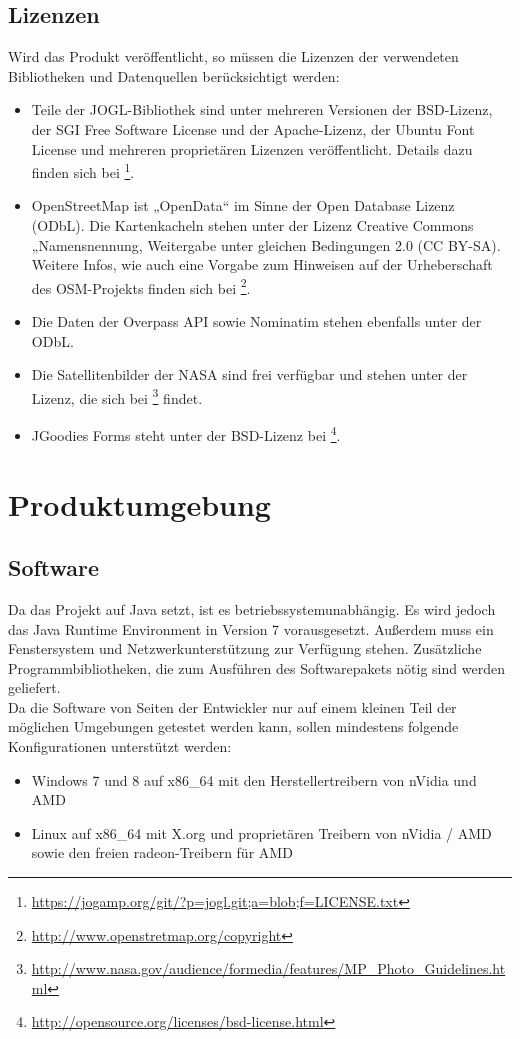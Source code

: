 \documentclass[10pt]{scrreprt}
\begin{document}
\section{Lizenzen}
Wird das Produkt veröffentlicht, so müssen die Lizenzen der verwendeten Bibliotheken und Datenquellen berücksichtigt werden:
\begin{itemize}
\item Teile der JOGL-Bibliothek sind unter mehreren Versionen der BSD-Lizenz, der SGI Free Software License und der Apache-Lizenz, der Ubuntu Font License und mehreren proprietären Lizenzen veröffentlicht. Details dazu finden sich bei  \footnote{\url{https://jogamp.org/git/?p=jogl.git;a=blob;f=LICENSE.txt}}.
\item OpenStreetMap ist „OpenData“ im Sinne der Open Database Lizenz (ODbL). Die Kartenkacheln stehen unter der Lizenz Creative Commons „Namensnennung, Weitergabe unter gleichen Bedingungen 2.0 (CC BY-SA). Weitere Infos, wie auch eine Vorgabe zum Hinweisen auf der Urheberschaft des OSM-Projekts finden sich bei \footnote{\url{http://www.openstretmap.org/copyright}}.
\item Die Daten der Overpass API sowie Nominatim stehen ebenfalls unter der ODbL.
\item Die Satellitenbilder der NASA sind frei verfügbar und stehen unter der Lizenz, die sich bei \footnote{\url{http://www.nasa.gov/audience/formedia/features/MP_Photo_Guidelines.html}} findet.
\item JGoodies Forms steht unter der BSD-Lizenz bei \footnote{\url{http://opensource.org/licenses/bsd-license.html}}.
\end{itemize}




\chapter{Produktumgebung}
\section{Software}
Da das Projekt auf Java setzt, ist es betriebssystemunabhängig. Es wird jedoch das Java Runtime Environment in Version 7 vorausgesetzt. Außerdem muss ein Fenstersystem und Netzwerkunterstützung zur Verfügung stehen. Zusätzliche Programmbibliotheken, die zum Ausführen des Softwarepakets nötig sind werden geliefert.\\

Da die Software von Seiten der Entwickler nur auf einem kleinen Teil der möglichen Umgebungen getestet werden kann, sollen mindestens folgende Konfigurationen unterstützt werden:
\begin{itemize}
\item Windows 7 und 8 auf x86{\_}64 mit den Herstellertreibern von nVidia und AMD
\item Linux auf x86{\_}64 mit X.org und proprietären Treibern von nVidia / AMD sowie den freien radeon-Treibern für AMD
\end{itemize}
\end{document}

